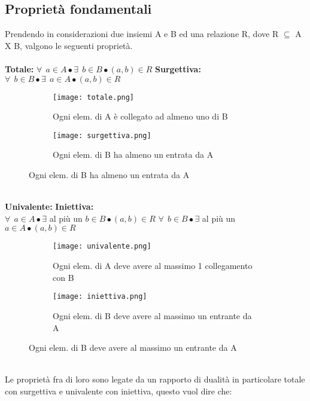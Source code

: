 \subsection{Proprietà fondamentali}
Prendendo in considerazioni due insiemi A e B ed una relazione R, dove R $\subseteq$ A X B, valgono le seguenti proprietà.\\ \\
\textbf{Totale:} $\forall \: \: a \in A \bullet \exists \: \: b \in B \bullet (a, b) \in R$ \hfill \textbf{Surgettiva:} $\forall \: \: b \in B \bullet \exists \: \: a \in A \bullet (a, b) \in R$
\begin{figure}[h!]
    \vspace{-8pt}
    \begin{subfigure}{.3\textwidth}
        \centering
        \texttt{[image: totale.png]}
        \caption{Ogni elem. di A è collegato ad almeno uno di B}
    \end{subfigure}
    \hspace{4.3cm}
    \begin{subfigure}{.3\textwidth}
        \centering
        \texttt{[image: surgettiva.png]}
        \caption{Ogni elem. di B ha almeno un entrata da A}
    \end{subfigure}
\end{figure}
\\
\textbf{Univalente:} \hspace{6.3cm} \textbf{Iniettiva:}\\ $\forall \: \: a \in A \bullet \exists$ al più un $b \in B \bullet (a, b) \in R$ \hspace{2.4cm}  $\forall \: \: b \in B \bullet \exists$ al più un $a \in A \bullet (a, b) \in R$
\begin{figure}[h!]
    \vspace{-7pt}
    \begin{subfigure}{.3\textwidth}
        \centering
        \texttt{[image: univalente.png]}
        \caption{Ogni elem. di A deve avere al massimo 1 collegamento con B}
    \end{subfigure}
    \hspace{4.3cm}
    \begin{subfigure}{.3\textwidth}
        \centering
        \texttt{[image: iniettiva.png]}
        \caption{Ogni elem. di B deve avere al massimo un entrante da A}
    \end{subfigure}
\end{figure}
\\
Le proprietà fra di loro sono legate da un rapporto di dualità in particolare totale con surgettiva e univalente con iniettiva, questo vuol dire che:
